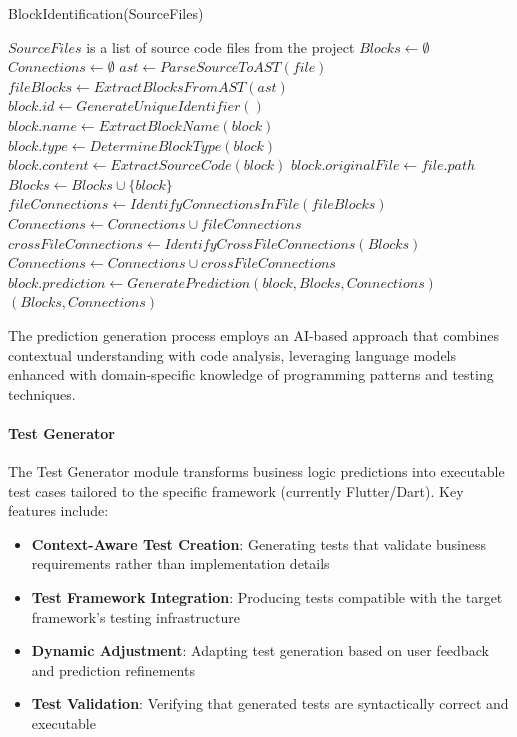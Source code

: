 \begin{algorithm}[H]
	\small
	\caption{BlockIdentification(SourceFiles)}
	\label{alg:block-identification}
	\begin{algorithmic}[1]
		\Require $SourceFiles$ is a list of source code files from the project
		\State $Blocks \gets \emptyset$ 
		\State $Connections \gets \emptyset$ 
		    \State $ast \gets ParseSourceToAST(file)$
		    \State $fileBlocks \gets ExtractBlocksFromAST(ast)$
		        \State $block.id \gets GenerateUniqueIdentifier()$
		        \State $block.name \gets ExtractBlockName(block)$
		        \State $block.type \gets DetermineBlockType(block)$
		        \State $block.content \gets ExtractSourceCode(block)$
		        \State $block.originalFile \gets file.path$
		        \State $Blocks \gets Blocks \cup \{block\}$
		    \EndFor
		    \State $fileConnections \gets IdentifyConnectionsInFile(fileBlocks)$
		    \State $Connections \gets Connections \cup fileConnections$
		\EndFor
		\State $crossFileConnections \gets IdentifyCrossFileConnections(Blocks)$
		\State $Connections \gets Connections \cup crossFileConnections$
		    \State $block.prediction \gets GeneratePrediction(block, Blocks, Connections)$
		\EndFor
		\State \Return $(Blocks, Connections)$
	\end{algorithmic}
\end{algorithm}

\hspace{0.5cm}The prediction generation process employs an AI-based approach that combines contextual understanding with code analysis, leveraging language models enhanced with domain-specific knowledge of programming patterns and testing techniques.

\paragraph{Test Generator}
\hspace{0.5cm}The Test Generator module transforms business logic predictions into executable test cases tailored to the specific framework (currently Flutter/Dart). Key features include:

\begin{itemize}
    \item \textbf{Context-Aware Test Creation}: Generating tests that validate business requirements rather than implementation details
    
    \item \textbf{Test Framework Integration}: Producing tests compatible with the target framework's testing infrastructure
    
    \item \textbf{Dynamic Adjustment}: Adapting test generation based on user feedback and prediction refinements
    
    \item \textbf{Test Validation}: Verifying that generated tests are syntactically correct and executable
\end{itemize}

